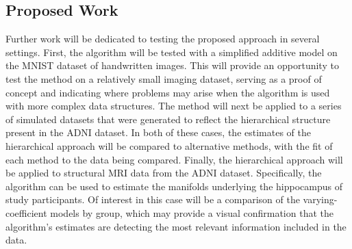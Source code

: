 \documentclass[11pt,reqno]{article}
\theoremstyle{definition}
\begin{document}
\subsection{Proposed Work}
Further work will be dedicated to testing the proposed approach in several settings. First, the algorithm will be tested with a simplified additive model on the MNIST dataset of handwritten images. This will provide an opportunity to test the method on a relatively small imaging dataset, serving as a proof of concept and indicating where problems may arise when the algorithm is used with more complex data structures. The method will next be applied to a series of simulated datasets that were generated to reflect the hierarchical structure present in the ADNI dataset. In both of these cases, the estimates of the hierarchical approach will be compared to alternative methods, with the fit of each method to the data being compared. Finally, the hierarchical approach will be applied to structural MRI data from the ADNI dataset. Specifically, the algorithm can be used to estimate the manifolds underlying the hippocampus of study participants. Of interest in this case will be a comparison of the varying-coefficient models by group, which may provide a visual confirmation that the algorithm's estimates are detecting the most relevant information included in the data.


\newpage

\nocite{*}
%
%
\printbibliography
\end{document}
